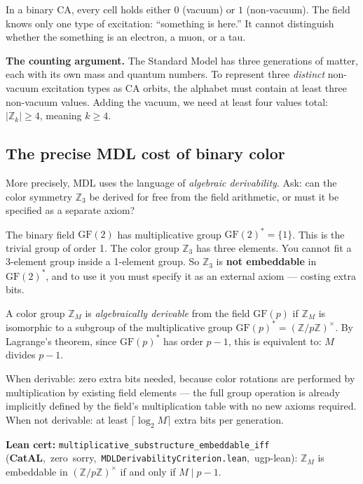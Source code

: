 \documentclass[11pt,a4paper]{article}
\newcommand{\term}[1]{\textbf{#1}}
\newcommand{\lean}[1]{\texttt{#1}}
\newcommand{\CatAL}{\textbf{CatAL}}
\theoremstyle{definition}
\begin{document}
In a binary CA, every cell holds either $0$ (vacuum) or $1$ (non-vacuum).
The field knows only one type of excitation: ``something is here.''  It
cannot distinguish whether the something is an electron, a muon, or a tau.

\medskip
\noindent
\textbf{The counting argument.}  The Standard Model has three generations
of matter, each with its own mass and quantum numbers.  To represent three
\emph{distinct} non-vacuum excitation types as CA orbits, the alphabet must
contain at least three non-vacuum values.  Adding the vacuum, we need at
least four values total: $|\mathbb{Z}_k| \geq 4$, meaning $k \geq 4$.

\subsection{The precise MDL cost of binary color}

More precisely, MDL uses the language of \emph{algebraic derivability}.
Ask: can the color symmetry $\mathbb{Z}_3$ be derived for free from the
field arithmetic, or must it be specified as a separate axiom?

The binary field $\mathrm{GF}(2)$ has multiplicative group
$\mathrm{GF}(2)^* = \{1\}$.  This is the trivial group of order 1.
The color group $\mathbb{Z}_3$ has three elements.  You cannot fit a
3-element group inside a 1-element group.  So $\mathbb{Z}_3$ is
\term{not embeddable} in $\mathrm{GF}(2)^*$, and to use it you must
specify it as an external axiom — costing extra bits.

\begin{tcolorbox}[colback=boxgreen,colframe=green!50!black,
  title={What ``derivable'' means}]
A color group $\mathbb{Z}_M$ is \emph{algebraically derivable} from the
field $\mathrm{GF}(p)$ if $\mathbb{Z}_M$ is isomorphic to a subgroup of
the multiplicative group $\mathrm{GF}(p)^* = (\mathbb{Z}/p\mathbb{Z})^\times$.
By Lagrange's theorem, since $\mathrm{GF}(p)^*$ has order $p-1$, this is
equivalent to: $M$ divides $p-1$.

When derivable: zero extra bits needed, because color rotations are performed
by multiplication by existing field elements --- the full group operation is
already implicitly defined by the field's multiplication table with no new
axioms required.
When not derivable: at least $\lceil\log_2 M\rceil$ extra bits per generation.
\end{tcolorbox}

\bigskip
\noindent
\textbf{Lean cert:}
\mbox{\lean{multiplicative\_substructure\_embeddable\_iff}}\\
\mbox{(\CatAL, zero sorry, \texttt{MDLDerivabilityCriterion.lean}, ugp-lean):}
$\mathbb{Z}_M$ is embeddable in $(\mathbb{Z}/p\mathbb{Z})^\times$ if and
only if $M \mid p - 1$.
\end{document}

